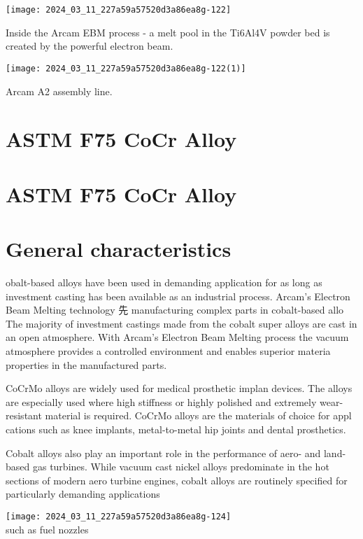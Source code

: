 \documentclass[10pt]{article}
\begin{document}
\begin{center}
\texttt{[image: 2024\_03\_11\_227a59a57520d3a86ea8g-122]}
\end{center}

Inside the Arcam EBM process - a melt pool in the Ti6Al4V powder bed is created by the powerful electron beam.

\begin{center}
\texttt{[image: 2024\_03\_11\_227a59a57520d3a86ea8g-122(1)]}
\end{center}

Arcam A2 assembly line.

\section*{ASTM F75 CoCr Alloy}
\section*{ASTM F75 CoCr Alloy}
\section*{General characteristics}
obalt-based alloys have been used in demanding application for as long as investment casting has been available as an industrial process. Arcam's Electron Beam Melting technology 先 manufacturing complex parts in cobalt-based allo The majority of investment castings made from the cobalt super alloys are cast in an open atmosphere. With Arcam's Electron Beam Melting process the vacuum atmosphere provides a controlled environment and enables superior materia properties in the manufactured parts.

CoCrMo alloys are widely used for medical prosthetic implan devices. The alloys are especially used where high stiffness or highly polished and extremely wear-resistant material is required. $\mathrm{CoCrMo}$ alloys are the materials of choice for appl cations such as knee implants, metal-to-metal hip joints and dental prosthetics.

Cobalt alloys also play an important role in the performance of aero- and land-based gas turbines. While vacuum cast nickel alloys predominate in the hot sections of modern aero turbine engines, cobalt alloys are routinely specified for particularly demanding applications

\texttt{[image: 2024\_03\_11\_227a59a57520d3a86ea8g-124]}\\
such as fuel nozzles
\end{document}
